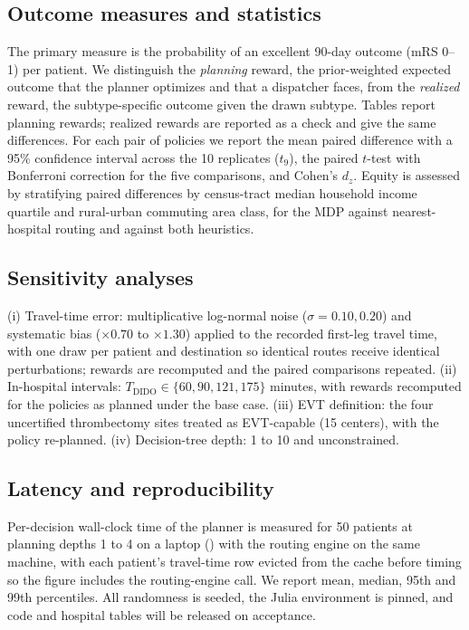 \subsection{Outcome measures and statistics}
The primary measure is the probability of an excellent 90-day outcome (mRS 0--1) per patient. We distinguish the \emph{planning} reward, the prior-weighted expected outcome that the planner optimizes and that a dispatcher faces, from the \emph{realized} reward, the subtype-specific outcome given the drawn subtype. Tables report planning rewards; realized rewards are reported as a check and give the same differences. For each pair of policies we report the mean paired difference with a 95\% confidence interval across the 10 replicates ($t_9$), the paired $t$-test with Bonferroni correction for the five comparisons, and Cohen's $d_z$. Equity is assessed by stratifying paired differences by census-tract median household income quartile and rural-urban commuting area class, for the MDP against nearest-hospital routing and against both heuristics.

\subsection{Sensitivity analyses}
(i) Travel-time error: multiplicative log-normal noise ($\sigma = 0.10, 0.20$) and systematic bias ($\times 0.70$ to $\times 1.30$) applied to the recorded first-leg travel time, with one draw per patient and destination so identical routes receive identical perturbations; rewards are recomputed and the paired comparisons repeated. (ii) In-hospital intervals: $T_{\text{DIDO}} \in \{60, 90, 121, 175\}$ minutes, with rewards recomputed for the policies as planned under the base case. (iii) EVT definition: the four uncertified thrombectomy sites treated as EVT-capable (15 centers), with the policy re-planned. (iv) Decision-tree depth: 1 to 10 and unconstrained.

\subsection{Latency and reproducibility}
Per-decision wall-clock time of the planner is measured for 50 patients at planning depths 1 to 4 on a laptop () with the routing engine on the same machine, with each patient's travel-time row evicted from the cache before timing so the figure includes the routing-engine call. We report mean, median, 95th and 99th percentiles. All randomness is seeded, the Julia environment is pinned, and code and hospital tables will be released on acceptance.
